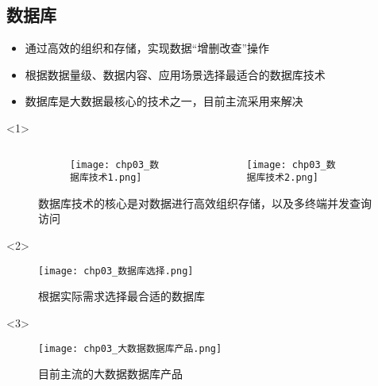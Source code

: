 \subsection{数据库}
\begin{frame}[t]{\subsecname}
\begin{itemize}
\item<1-> 通过高效的组织和存储，实现数据“增删改查”操作
\item<2-> 根据数据量级、数据内容、应用场景选择最适合的数据库技术
\item<3-> 数据库是大数据最核心的技术之一，目前主流采用来解决
\end{itemize}

\begin{overlayarea}{\textwidth}{\textheight}
\vspace{-5pt}
  \begin{onlyenv}<1>
\begin{figure} \centering
\begin{columns}[b]
  \begin{column}{.5\textwidth}
    \begin{figure}
      \texttt{[image: chp03\_数据库技术1.png]}
    \end{figure}
  \end{column}
  \begin{column}{.5\textwidth}
    \begin{figure}\flushleft
      \texttt{[image: chp03\_数据库技术2.png]}
    \end{figure}
  \end{column}
\end{columns}
\caption{数据库技术的核心是对数据进行高效组织存储，以及多终端并发查询访问} 
\end{figure}
  \end{onlyenv}

\vspace{-10pt}
  \begin{onlyenv}<2>
\begin{figure}
  \centering
  \texttt{[image: chp03\_数据库选择.png]}
  \caption{根据实际需求选择最合适的数据库}
\end{figure}
  \end{onlyenv}

  \begin{onlyenv}<3>
\begin{figure}
  \centering
  \texttt{[image: chp03\_大数据数据库产品.png]}
  \caption{目前主流的大数据数据库产品}
\end{figure}
  \end{onlyenv}
\end{overlayarea}
\end{frame}


